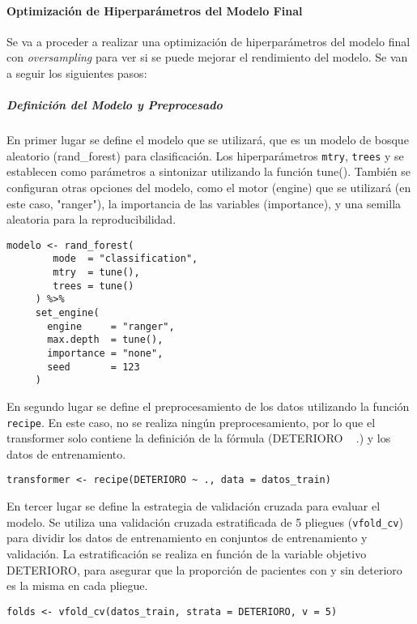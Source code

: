 \paragraph{Optimización de Hiperparámetros del Modelo Final}

Se va a proceder a realizar una optimización de hiperparámetros del modelo final con \textit{oversampling} para ver si se puede mejorar el rendimiento del modelo. Se van a seguir los siguientes pasos:

\subparagraph{Definición del Modelo y Preprocesado}

En primer lugar se define el modelo que se utilizará, que es un modelo de bosque aleatorio (rand\_forest) para clasificación. Los hiperparámetros \texttt{mtry}, \texttt{trees} y  se establecen como parámetros a sintonizar utilizando la función tune(). También se configuran otras opciones del modelo, como el motor (engine) que se utilizará (en este caso, "ranger"), la importancia de las variables (importance), y una semilla aleatoria para la reproducibilidad.

\begin{lstlisting}[style=mystyle]
    modelo <- rand_forest(
        mode  = "classification",
        mtry  = tune(),
        trees = tune()
     ) %>%
     set_engine(
       engine     = "ranger",
       max.depth  = tune(),
       importance = "none",
       seed       = 123
     )
\end{lstlisting}

En segundo lugar se define el preprocesamiento de los datos utilizando la función \texttt{recipe}. En este caso, no se realiza ningún preprocesamiento, por lo que el transformer solo contiene la definición de la fórmula (DETERIORO ~ .) y los datos de entrenamiento.

\begin{lstlisting}[style=mystyle]
    transformer <- recipe(DETERIORO ~ ., data = datos_train)
\end{lstlisting}

En tercer lugar se define la estrategia de validación cruzada para evaluar el modelo. Se utiliza una validación cruzada estratificada de 5 pliegues (\texttt{vfold\_cv}) para dividir los datos de entrenamiento en conjuntos de entrenamiento y validación. La estratificación se realiza en función de la variable objetivo DETERIORO, para asegurar que la proporción de pacientes con y sin deterioro es la misma en cada pliegue.

\begin{lstlisting}[style=mystyle]
    folds <- vfold_cv(datos_train, strata = DETERIORO, v = 5)
\end{lstlisting}


